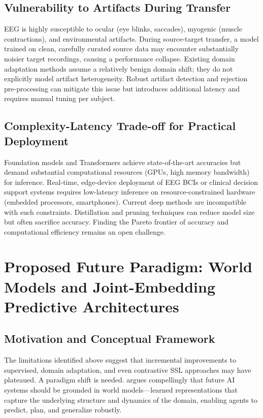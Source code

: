 \documentclass[11pt]{article}
\begin{document}
\subsection{Vulnerability to Artifacts During Transfer}

EEG is highly susceptible to ocular (eye blinks, saccades), myogenic (muscle contractions), and environmental artifacts. During source-target transfer, a model trained on clean, carefully curated source data may encounter substantially noisier target recordings, causing a performance collapse. Existing domain adaptation methods assume a relatively benign domain shift; they do not explicitly model artifact heterogeneity. Robust artifact detection and rejection pre-processing can mitigate this issue but introduces additional latency and requires manual tuning per subject.

\subsection{Complexity-Latency Trade-off for Practical Deployment}

Foundation models and Transformers achieve state-of-the-art accuracies but demand substantial computational resources (GPUs, high memory bandwidth) for inference. Real-time, edge-device deployment of EEG BCIs or clinical decision support systems requires low-latency inference on resource-constrained hardware (embedded processors, smartphones). Current deep methods are incompatible with such constraints. Distillation and pruning techniques can reduce model size but often sacrifice accuracy. Finding the Pareto frontier of accuracy and computational efficiency remains an open challenge.

\section{Proposed Future Paradigm: World Models and Joint-Embedding Predictive Architectures}\label{sec:future}

\subsection{Motivation and Conceptual Framework}

The limitations identified above suggest that incremental improvements to supervised, domain adaptation, and even contrastive SSL approaches may have plateaued. A paradigm shift is needed. \citet{lecun2022world} argues compellingly that future AI systems should be grounded in world models—learned representations that capture the underlying structure and dynamics of the domain, enabling agents to predict, plan, and generalize robustly.
\end{document}
